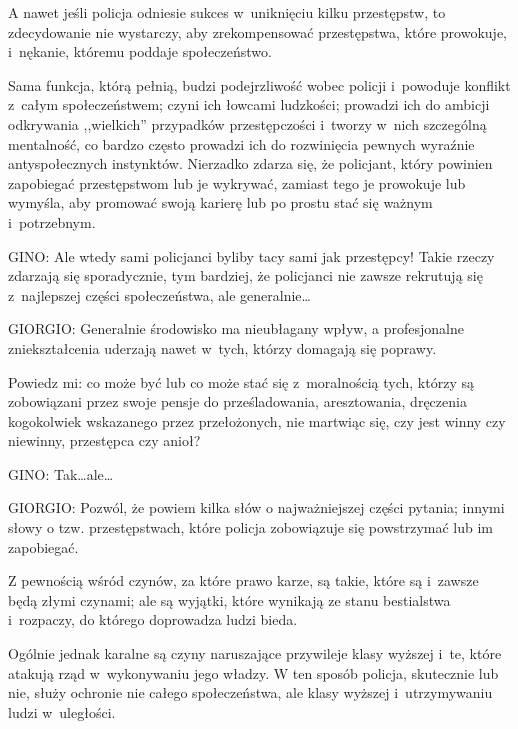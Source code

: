 \documentclass[oneside,polish,11pt,sfheadings]{mwbk}
\begin{document}
 
A nawet jeśli policja odniesie sukces w~uniknięciu kilku przestępstw, to zdecydowanie nie wystarczy, aby zrekompensować
przestępstwa, które prowokuje, i~nękanie, któremu poddaje społeczeństwo. 

 
Sama funkcja, którą pełnią, budzi podejrzliwość wobec policji i~powoduje konflikt z~całym społeczeństwem; czyni ich
łowcami ludzkości; prowadzi ich do ambicji odkrywania ,,wielkich'' przypadków przestępczości i~tworzy w~nich szczególną
mentalność, co bardzo często prowadzi ich do rozwinięcia pewnych wyraźnie antyspołecznych instynktów. Nierzadko zdarza
się, że policjant, który powinien zapobiegać przestępstwom lub je wykrywać, zamiast tego je prowokuje lub wymyśla, aby
promować swoją karierę lub po prostu stać się ważnym i~potrzebnym. 




 
\noindent \noindent GINO: Ale wtedy sami policjanci byliby tacy sami jak przestępcy! Takie rzeczy zdarzają się sporadycznie, tym bardziej,
że policjanci nie zawsze rekrutują się z~najlepszej części społeczeństwa, ale generalnie\ldots 




 
\noindent GIORGIO: Generalnie środowisko ma nieubłagany wpływ, a profesjonalne zniekształcenia uderzają nawet w~tych, którzy
domagają się poprawy. 

 
Powiedz mi: co może być lub co może stać się z~moralnością tych, którzy są zobowiązani przez swoje pensje do
prześladowania, aresztowania, dręczenia kogokolwiek wskazanego przez przełożonych, nie martwiąc się, czy jest winny czy
niewinny, przestępca czy anioł? 




 
\noindent \noindent GINO: Tak\ldots ale\ldots 




 
\noindent GIORGIO: Pozwól, że powiem kilka słów o najważniejszej części pytania; innymi słowy o tzw. przestępstwach, które policja
zobowiązuje się powstrzymać lub im zapobiegać. 

 
Z pewnością wśród czynów, za które prawo karze, są takie, które są i~zawsze będą złymi czynami; ale są wyjątki, które
wynikają ze stanu bestialstwa i~rozpaczy, do którego doprowadza ludzi bieda. 

 
Ogólnie jednak karalne są czyny naruszające przywileje klasy wyższej i~te, które atakują rząd w~wykonywaniu jego władzy.
W ten sposób policja, skutecznie lub nie, służy ochronie nie całego społeczeństwa, ale klasy wyższej i~utrzymywaniu
ludzi w~uległości. 
\end{document}
